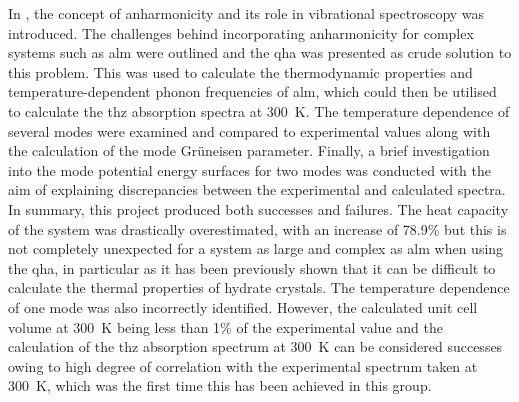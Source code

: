 In , the concept of anharmonicity and its role in vibrational spectroscopy was introduced. The challenges behind incorporating anharmonicity for complex systems such as \acrshort{alm} were outlined and the \acrshort{qha} was presented as crude solution to this problem. This was used to calculate the thermodynamic properties and temperature\nobreakdash-dependent phonon frequencies of \acrshort{alm}, which could then be utilised to calculate the \acrshort{thz} absorption spectra at \SI{300}{K}. The temperature dependence of several modes were examined and compared to experimental values along with the calculation of the mode Gr\"uneisen parameter. Finally, a brief investigation into the mode potential energy surfaces for two modes was conducted with the aim of explaining discrepancies between the experimental and calculated spectra. In summary, this project produced both successes and failures. The heat capacity of the system was drastically overestimated, with an increase of 78.9\% but this is not completely unexpected for a system as large and complex as \acrshort{alm} when using the \acrshort{qha}, in particular as it has been previously shown that it can be difficult to calculate the thermal properties of hydrate crystals. The temperature dependence of one mode was also incorrectly identified. However, the calculated unit cell volume at \SI{300}{K} being less than 1\% of the experimental value and the calculation of the \acrshort{thz} absorption spectrum at \SI{300}{K} can be considered successes owing to high degree of correlation with the experimental spectrum taken at \SI{300}{K}, which was the first time this has been achieved in this group.

